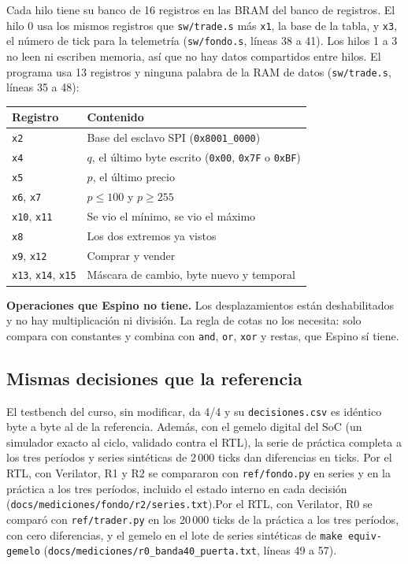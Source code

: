 \documentclass[11pt,a4paper]{article}
\newcommand{\arch}[1]{\texttt{#1}}
\begin{document}
\ifpeldanofondo
Cada hilo tiene su banco de 16 registros en las BRAM del banco de registros. El hilo 0 usa los mismos registros que \arch{sw/trade.s} más \texttt{x1}, la base de la tabla, y \texttt{x3}, el número de tick para la telemetría (\arch{sw/fondo.s}, líneas 38 a 41). Los hilos 1 a 3 no leen ni escriben memoria, así que no hay datos compartidos entre hilos.
\else
El programa usa 13 registros y ninguna palabra de la RAM de datos (\arch{sw/trade.s}, líneas 35 a 48):
\begin{center}\small
\begin{tabular}{ll}
\toprule
Registro & Contenido \\
\midrule
\texttt{x2} & Base del esclavo SPI (\texttt{0x8001\_0000}) \\
\texttt{x4} & $q$, el último byte escrito (\texttt{0x00}, \texttt{0x7F} o \texttt{0xBF}) \\
\texttt{x5} & $p$, el último precio \\
\texttt{x6}, \texttt{x7} & $p \le 100$ y $p \ge 255$ \\
\texttt{x10}, \texttt{x11} & Se vio el mínimo, se vio el máximo \\
\texttt{x8} & Los dos extremos ya vistos \\
\texttt{x9}, \texttt{x12} & Comprar y vender \\
\texttt{x13}, \texttt{x14}, \texttt{x15} & Máscara de cambio, byte nuevo y temporal \\
\bottomrule
\end{tabular}
\end{center}
\fi

\textbf{Operaciones que Espino no tiene.} Los desplazamientos están deshabilitados y no hay multiplicación ni división. La regla de cotas no los necesita: solo compara con constantes y combina con \texttt{and}, \texttt{or}, \texttt{xor} y restas, que Espino sí tiene.

\subsection{Mismas decisiones que la referencia}

El testbench del curso, sin modificar, da 4/4 y su \texttt{decisiones.csv} es idéntico byte a byte al de la referencia. Además, con el gemelo digital del SoC (un simulador exacto al ciclo, validado contra el RTL), la serie de práctica completa a los tres períodos y \cifraEqSeries{} series sintéticas de 2\,000 ticks dan \cifraEqDistintas{} diferencias en \cifraEqTicks{} ticks. \ifpeldanofondo Por el RTL, con Verilator, R1 y R2 se compararon con \arch{ref/fondo.py} en \cifraSeriesRTL{} series y en la práctica a los tres períodos, incluido el estado interno en cada decisión (\arch{docs/mediciones/fondo/r2/series.txt}).\else Por el RTL, con Verilator, R0 se comparó con \arch{ref/trader.py} en los 20\,000 ticks de la práctica a los tres períodos, con cero diferencias, y el gemelo en el lote de series sintéticas de \texttt{make equiv-gemelo} (\arch{docs/mediciones/r0\_banda40\_puerta.txt}, líneas 49 a 57).\fi
\end{document}
